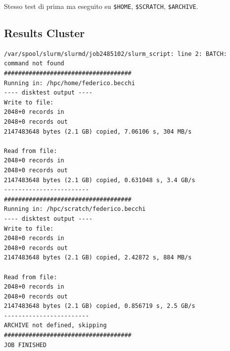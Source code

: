 \documentclass[a4paper,12pt]{article}
\begin{document}
Stesso test di prima ma eseguito su \texttt{\$HOME}, \texttt{\$SCRATCH}, \texttt{\$ARCHIVE}.

\subsection{Results Cluster}

\begin{lstlisting}
/var/spool/slurm/slurmd/job2485102/slurm_script: line 2: BATCH: command not found
####################################
Running in: /hpc/home/federico.becchi
---- disktest output ----
Write to file:
2048+0 records in
2048+0 records out
2147483648 bytes (2.1 GB) copied, 7.06106 s, 304 MB/s

Read from file:
2048+0 records in
2048+0 records out
2147483648 bytes (2.1 GB) copied, 0.631048 s, 3.4 GB/s
------------------------
####################################
Running in: /hpc/scratch/federico.becchi
---- disktest output ----
Write to file:
2048+0 records in
2048+0 records out
2147483648 bytes (2.1 GB) copied, 2.42872 s, 884 MB/s

Read from file:
2048+0 records in
2048+0 records out
2147483648 bytes (2.1 GB) copied, 0.856719 s, 2.5 GB/s
------------------------
ARCHIVE not defined, skipping
####################################
JOB FINISHED
\end{lstlisting}
\end{document}
